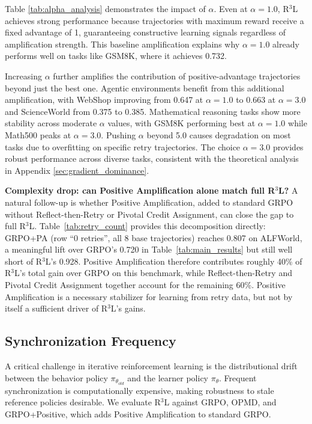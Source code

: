 \documentclass{article} %
\theoremstyle{definition}
\theoremstyle{remark}
\begin{document}


Table \ref{tab:alpha_analysis} demonstrates the impact of $\alpha$. Even at $\alpha=1.0$, R$^3$L achieves strong performance because trajectories with maximum reward receive a fixed advantage of 1, guaranteeing constructive learning signals regardless of amplification strength. This baseline amplification explains why $\alpha=1.0$ already performs well on tasks like GSM8K, where it achieves 0.732. 

Increasing $\alpha$ further amplifies the contribution of positive-advantage trajectories beyond just the best one. Agentic environments benefit from this additional amplification, with WebShop improving from 0.647 at $\alpha=1.0$ to 0.663 at $\alpha=3.0$ and ScienceWorld from 0.375 to 0.385. Mathematical reasoning tasks show more stability across moderate $\alpha$ values, with GSM8K performing best at $\alpha=1.0$ while Math500 peaks at $\alpha=3.0$. Pushing $\alpha$ beyond 5.0 causes degradation on most tasks due to overfitting on specific retry trajectories. The choice $\alpha=3.0$ provides robust performance across diverse tasks, consistent with the theoretical analysis in Appendix \ref{sec:gradient_dominance}.

\textbf{Complexity drop: can Positive Amplification alone match full R$^3$L?} A natural follow-up is whether Positive Amplification, added to standard GRPO without Reflect-then-Retry or Pivotal Credit Assignment, can close the gap to full R$^3$L. Table~\ref{tab:retry_count} provides this decomposition directly: GRPO+PA (row ``0 retries'', all 8 base trajectories) reaches 0.807 on ALFWorld, a meaningful lift over GRPO's 0.720 in Table~\ref{tab:main_results} but still well short of R$^3$L's 0.928. Positive Amplification therefore contributes roughly 40\% of R$^3$L's total gain over GRPO on this benchmark, while Reflect-then-Retry and Pivotal Credit Assignment together account for the remaining 60\%. Positive Amplification is a necessary stabilizer for learning from retry data, but not by itself a sufficient driver of R$^3$L's gains.

\subsection{Synchronization Frequency}
A critical challenge in iterative reinforcement learning is the distributional drift between the behavior policy $\pi_{\theta_{old}}$ and the learner policy $\pi_{\theta}$. Frequent synchronization is computationally expensive, making robustness to stale reference policies desirable. We evaluate R$^3$L against GRPO, OPMD, and GRPO+Positive, which adds Positive Amplification to standard GRPO.
\end{document}
